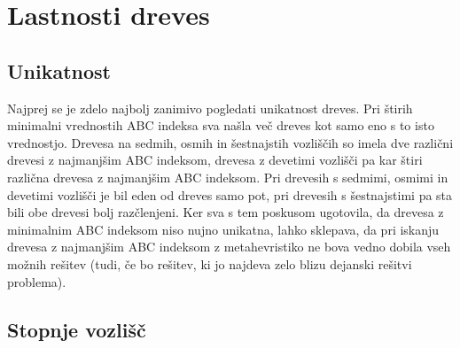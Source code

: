 \documentclass[a4paper,12 pt]{article}
\begin{document}
\section[Lastnosti dreves]{Lastnosti dreves}

\subsection[Unikatnost]{Unikatnost}

Najprej se je zdelo najbolj zanimivo pogledati unikatnost dreves. Pri štirih minimalni vrednostih ABC indeksa sva našla več dreves kot samo eno s to isto vrednostjo. Drevesa na sedmih, osmih in šestnajstih vozliščih so imela dve različni drevesi z najmanjšim ABC indeksom, drevesa z devetimi vozlišči pa kar štiri različna drevesa z najmanjšim ABC indeksom. Pri drevesih s sedmimi, osmimi in devetimi vozlišči je bil eden od dreves samo pot, pri drevesih s šestnajstimi pa sta bili obe drevesi bolj razčlenjeni. Ker sva s tem poskusom ugotovila, da drevesa z minimalnim ABC indeksom niso nujno unikatna, lahko sklepava, da pri iskanju drevesa z najmanjšim ABC indeksom z metahevristiko ne bova vedno dobila vseh možnih rešitev (tudi, če bo rešitev, ki jo najdeva zelo blizu dejanski rešitvi problema).

\subsection[Stopnje vozlišč]{Stopnje vozlišč}
\end{document}
